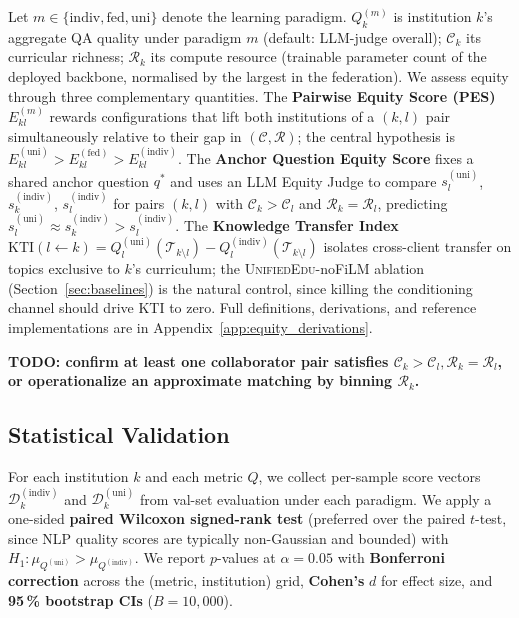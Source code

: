 \documentclass[11pt]{article}
\theoremstyle{plain}
\theoremstyle{definition}
\theoremstyle{remark}
\newcommand{\red}[1]{\textcolor{myred}{\textbf{#1}}}
\newcommand{\UniEdu}{\textsc{UnifiedEdu}}
\newcommand{\indiv}{\text{indiv}}
\newcommand{\fed}{\text{fed}}
\newcommand{\uni}{\text{uni}}
\begin{document}
Let $m \in \{\indiv, \fed, \uni\}$ denote the
learning paradigm. $Q_k^{(m)}$ is institution $k$'s
aggregate QA quality under paradigm $m$ (default:
LLM-judge overall); $\mathcal{C}_k$ its curricular
richness; $\mathcal{R}_k$ its compute resource
(trainable parameter count of the deployed backbone,
normalised by the largest in the federation). We
assess equity through three complementary
quantities. The \textbf{Pairwise Equity Score (PES)}
$E_{kl}^{(m)}$ rewards configurations that lift both
institutions of a $(k, l)$ pair simultaneously
relative to their gap in $(\mathcal{C}, \mathcal{R})$;
the central hypothesis is $E_{kl}^{(\uni)} >
E_{kl}^{(\fed)} > E_{kl}^{(\indiv)}$. The
\textbf{Anchor Question Equity Score} fixes a
shared anchor question $q^*$ and uses an LLM Equity
Judge to compare $s_l^{(\uni)}$, $s_k^{(\indiv)}$,
$s_l^{(\indiv)}$ for pairs $(k, l)$ with
$\mathcal{C}_k > \mathcal{C}_l$ and $\mathcal{R}_k =
\mathcal{R}_l$, predicting $s_l^{(\uni)} \approx
s_k^{(\indiv)} > s_l^{(\indiv)}$. The
\textbf{Knowledge Transfer Index} $\mathrm{KTI}(l
\leftarrow k) = Q_l^{(\uni)}(\mathcal{T}_{k\setminus
l}) - Q_l^{(\indiv)}(\mathcal{T}_{k\setminus l})$
isolates cross-client transfer on
topics exclusive to $k$'s curriculum; the
\UniEdu{}-noFiLM ablation
(Section~\ref{sec:baselines}) is the natural
control, since killing the conditioning channel
should drive KTI to zero. Full definitions,
derivations, and reference implementations are in
Appendix~\ref{app:equity_derivations}.

\red{TODO: confirm at least one collaborator pair satisfies $\mathcal{C}_k > \mathcal{C}_l, \mathcal{R}_k = \mathcal{R}_l$, or operationalize an approximate matching by binning $\mathcal{R}_k$.}

\subsection{Statistical Validation}
\label{sec:stats}

For each institution $k$ and each metric $Q$, we
collect per-sample score vectors
$\mathcal{D}_k^{(\indiv)}$ and $\mathcal{D}_k^{(\uni)}$
from val-set evaluation under each paradigm. We
apply a one-sided \textbf{paired Wilcoxon
signed-rank test} (preferred over the paired
$t$-test, since NLP quality scores are typically
non-Gaussian and bounded) with $H_1: \mu_{Q^{(\uni)}}
> \mu_{Q^{(\indiv)}}$. We report $p$-values at
$\alpha{=}0.05$ with \textbf{Bonferroni correction}
across the (metric, institution) grid,
\textbf{Cohen's} $d$ for effect size, and
\textbf{95\,\% bootstrap CIs} ($B{=}10{,}000$).
\end{document}

